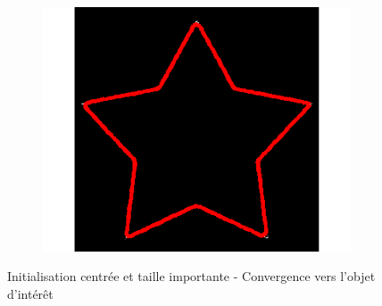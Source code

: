 \begin{appendices}
\begin{figure}[H]
\begin{subfigure}[c]{0.3\linewidth}
\includegraphics[width=\textwidth]{Chapters/Images/Init/vfccl3}
\caption{}
\end{subfigure}
\caption{Initialisation centrée et taille importante - Convergence vers l'objet d'intérêt}
\end{figure}


\end{appendices}
